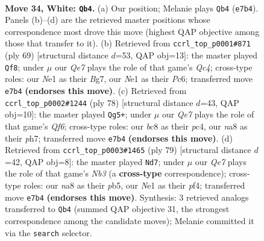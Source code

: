 \documentclass[11pt]{article}
\begin{document}
\clearpage

\begin{figure}[p]\centering
\begin{subfigure}{0.46\textwidth}\centering
\resizebox{\linewidth}{!}{%
\newchessgame
\chessboard[
  setfen={n1b4r/4Q3/7k/1p4p1/7p/P2P1P2/7K/4Nq2 w - - 0 34},
  showmover=false,
  pgfstyle=straightmove, color=movearrow, markmove={e7-b4}
]}
\caption{}
\end{subfigure}\hfill
\begin{subfigure}{0.46\textwidth}\centering
\resizebox{\linewidth}{!}{%
\newchessgame
\chessboard[
  setfen={6k1/pp1Q2b1/2p4p/2q5/5P2/1P6/P6P/5B1K b - - 1 35},
  showmover=false,
  pgfstyle=straightmove, color=movearrow, markmove={c5-f8}
]}
\caption{}
\end{subfigure}
\\[4pt]
\begin{subfigure}{0.46\textwidth}\centering
\resizebox{\linewidth}{!}{%
\newchessgame
\chessboard[
  setfen={4r1k1/1q2P2p/p4Q2/8/P1p5/5NPP/5P2/6K1 w - - 1 40},
  showmover=false,
  pgfstyle=straightmove, color=movearrow, markmove={f6-g5}
]}
\caption{}
\end{subfigure}\hfill
\begin{subfigure}{0.46\textwidth}\centering
\resizebox{\linewidth}{!}{%
\newchessgame
\chessboard[
  setfen={5k2/5p1p/1n6/1Ppp3B/4qP2/2P3P1/Q6K/8 b - - 2 40},
  showmover=false,
  pgfstyle=straightmove, color=movearrow, markmove={b6-d7}
]}
\caption{}
\end{subfigure}
\caption{\textbf{Move 34, White: \texttt{Qb4}.} (a) Our position; Melanie plays \texttt{Qb4} (\texttt{e7b4}). Panels (b)--(d) are the retrieved master positions whose correspondence most drove this move (highest QAP objective among those that transfer to it). (b) Retrieved from \texttt{ccrl\_top\_p0001\#871} (ply 69) [structural distance $d$=53, QAP obj=13]: the master played \texttt{Qf8}; under $\mu$ our \emph{Qe7} plays the role of that game's \emph{Qc4}; cross-type roles: our \emph{N}e1 as their \emph{B}g7, our \emph{N}e1 as their \emph{P}c6; transferred move \texttt{e7b4} \textbf{(endorses this move)}. (c) Retrieved from \texttt{ccrl\_top\_p0002\#1244} (ply 78) [structural distance $d$=43, QAP obj=10]: the master played \texttt{Qg5+}; under $\mu$ our \emph{Qe7} plays the role of that game's \emph{Qf6}; cross-type roles: our \emph{b}c8 as their \emph{p}c4, our \emph{n}a8 as their \emph{p}h7; transferred move \texttt{e7b4} \textbf{(endorses this move)}. (d) Retrieved from \texttt{ccrl\_top\_p0003\#1465} (ply 79) [structural distance $d$=42, QAP obj=8]: the master played \texttt{Nd7}; under $\mu$ our \emph{Qe7} plays the role of that game's \emph{Nb3} (a \textbf{cross-type} correspondence); cross-type roles: our \emph{n}a8 as their \emph{p}b5, our \emph{N}e1 as their \emph{p}f4; transferred move \texttt{e7b4} \textbf{(endorses this move)}. Synthesis: 3 retrieved analogs transferred to \texttt{Qb4} (summed QAP objective 31, the strongest correspondence among the candidate moves); Melanie committed it via the \texttt{search} selector.}
\label{fig:thought-m66}
\end{figure}
\end{document}
